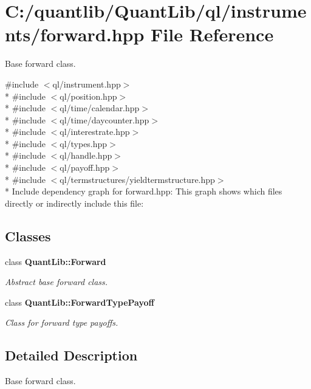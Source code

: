 \section{C\+:/quantlib/\+Quant\+Lib/ql/instruments/forward.hpp File Reference}
\label{forward_8hpp}


Base forward class.  


{\ttfamily \#include $<$ql/instrument.\+hpp$>$}\\*
{\ttfamily \#include $<$ql/position.\+hpp$>$}\\*
{\ttfamily \#include $<$ql/time/calendar.\+hpp$>$}\\*
{\ttfamily \#include $<$ql/time/daycounter.\+hpp$>$}\\*
{\ttfamily \#include $<$ql/interestrate.\+hpp$>$}\\*
{\ttfamily \#include $<$ql/types.\+hpp$>$}\\*
{\ttfamily \#include $<$ql/handle.\+hpp$>$}\\*
{\ttfamily \#include $<$ql/payoff.\+hpp$>$}\\*
{\ttfamily \#include $<$ql/termstructures/yieldtermstructure.\+hpp$>$}\\*
Include dependency graph for forward.\+hpp\+:
This graph shows which files directly or indirectly include this file\+:
\subsection*{Classes}
\begin{DoxyCompactItemize}
\item 
class {\bf Quant\+Lib\+::\+Forward}
\begin{DoxyCompactList}\small\item\em Abstract base forward class. \end{DoxyCompactList}\item 
class {\bf Quant\+Lib\+::\+Forward\+Type\+Payoff}
\begin{DoxyCompactList}\small\item\em Class for forward type payoffs. \end{DoxyCompactList}\end{DoxyCompactItemize}


\subsection{Detailed Description}
Base forward class. 

